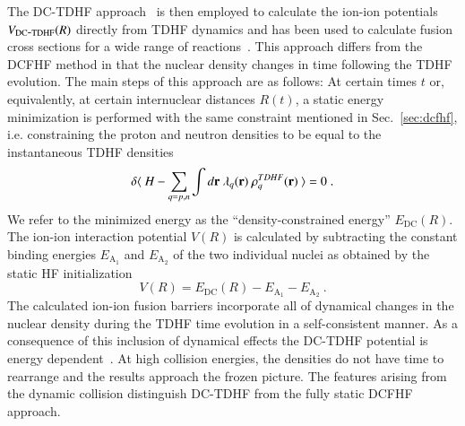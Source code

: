 The DC-TDHF approach~\protect\citep{umar2006b} is then employed to calculate the ion-ion potentials $V_{\mathrm{DC{\hbox{-}}TDHF}}(R)$ directly from TDHF dynamics and has been used to calculate fusion cross sections for a wide range of
reactions~\protect\citep{godbey2017,umar2014a,simenel2013a,umar2012a,umar2006a,oberacker2010,umar2009a,jiang2015a}.
This approach differs from the DCFHF method in that the nuclear density changes in time following the
TDHF evolution.
The main steps of this approach are as follows:
At certain times $t$ or, equivalently, at certain internuclear distances
$R(t)$, a static energy minimization is performed with the same constraint mentioned in Sec.~\ref{sec:dcfhf}, i.e. constraining the proton and neutron densities to be equal to the instantaneous TDHF densities
\begin{equation}
\delta \< \ H - \sum_{q=p,n}\int d\vr \ \lambda_q(\vr) \ \rho^{TDHF}_q(\vr) \ \> = 0\;.
\label{eq:var_dens}
\end{equation}
We refer to the minimized energy as the ``density-constrained energy''
$E_{\mathrm{DC}}(R)$.
The ion-ion interaction potential $V(R)$ is calculated by
subtracting the constant binding energies
$E_{\mathrm{A_{1}}}$ and $E_{\mathrm{A_{2}}}$ of the two individual nuclei as obtained by the static HF initialization
\begin{equation}
V(R)=E_{\mathrm{DC}}(R)-E_{\mathrm{A_{1}}}-E_{\mathrm{A_{2}}}\ .
\label{eq:dctdhfvr}
\end{equation}
The calculated ion-ion fusion barriers incorporate all of dynamical changes in the nuclear density during the TDHF time evolution in a self-consistent manner.
As a consequence of this inclusion of dynamical effects the DC-TDHF potential is energy dependent~\protect\citep{umar2014a}.
At high collision energies, the densities do not have time to rearrange and the results approach the frozen picture.
The features arising from the dynamic collision distinguish DC-TDHF from the fully static DCFHF approach.

